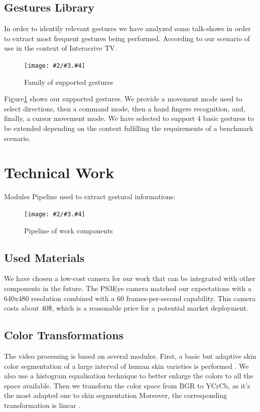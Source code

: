 \documentclass{llncs}
\newcommand\ignore[1]{}
\newcommand{\imagepathext}[5]{%
\begin{figure}[!htbp]
\hfil\texttt{[image: \#2/\#3.\#4]}\hfil
\caption{#5\label{#3}}
\end{figure}}
\newcommand{\png}[2]{\imagepathext{width=\columnwidth}{pics}{#1}{png}{#2}}
\begin{document}
\subsection{Gestures Library}

In order to identify relevant gestures we have analyzed some talk-shows in order
to extract most frequent gestures being performed.
According to our scenario of use in the context of Interacrive TV.

\png{handg}{Family of supported gestures}

Figure\ref{handg} shows our supported gestures. We provide a movement mode
used to select directions, then a command mode, then a hand fingers recognition,
and, finally, a cursor movement mode.
\pagebreak 
We have selected to support 4 basic gestures to be extended depending on the
context fulfilling the requirements of a benchmark scenario.

\section{Technical Work}

Modules Pipeline used to extract gestural informations:

\png{pipeline}{Pipeline of work components}

\subsection{Used Materials}
We have chosen a low-cost camera for our work that can be integrated with other components in the future.
The PS3Eye camera matched our expectations with a 640x480 resolution combined with a 60 frames-per-second capability.
This camera costs about 40\$, which is a reasonable price for a potential market deployment.

\ignore{
} 

\subsection{Color Transformations}
The video processing is based on several modules. First, a basic but adaptive skin color segmentation of a large interval of human skin varieties is performed \cite{skinColorSeg}.
We also use a histogram equalisation technique to better enlarge the colors to all the space available.
Then we transform the color space from BGR to YCrCb, as it’s the most adapted one to skin segmentation
Moreover, the corresponding transformation is linear \cite{skinColorSeg}.
\end{document}
